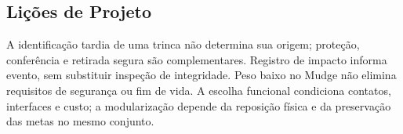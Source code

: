 \subsection{Lições de Projeto}

A identificação tardia de uma trinca não determina sua origem; proteção, conferência e retirada segura são complementares. Registro de impacto informa evento, sem substituir inspeção de integridade. Peso baixo no Mudge não elimina requisitos de segurança ou fim de vida. A escolha funcional condiciona contatos, interfaces e custo; a modularização depende da reposição física e da preservação das metas no mesmo conjunto.
